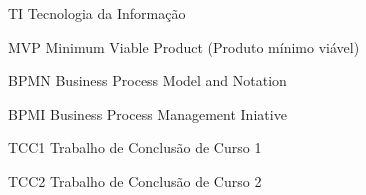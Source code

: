 \begin{siglas}
  \item[TI] Tecnologia da Informação
  \item[MVP] Minimum Viable Product (Produto mínimo viável)
  \item[BPMN] Business Process Model and Notation
  \item[BPMI] Business Process Management Iniative
  \item[TCC1] Trabalho de Conclusão de Curso 1
  \item[TCC2] Trabalho de Conclusão de Curso 2
\end{siglas}